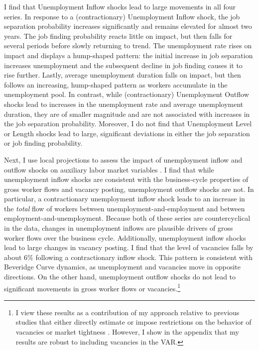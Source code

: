 \documentclass[12pt]{article}
\begin{document}
I find that Unemployment Inflow shocks lead to large movements in all four series. In response to a (contractionary) Unemployment Inflow shock, the job separation probability increases significantly and remains elevated for almost two years. The job finding probability reacts little on impact, but then falls for several periods before slowly returning to trend. The unemployment rate rises on impact and displays a hump-shaped pattern: the initial increase in job separation increases unemployment and the subsequent decline in job finding causes it to rise further. Lastly, average unemployment duration falls on impact, but then follows an increasing, hump-shaped pattern as workers accumulate in the unemployment pool. In contrast, while (contractionary) Unemployment Outflow shocks lead to increases in the unemployment rate and average unemployment duration, they are of smaller magnitude and are not associated with increases in the job separation probability. Moreover, I do not find that Unemployment Level or Length shocks lead to large, significant deviations in either the job separation or job finding probability.
 
Next, I use local projections to assess the impact of unemployment inflow and outflow shocks on auxiliary labor market variables \citep{Jorda:2005aa}. I find that while unemployment inflow shocks are consistent with the business-cycle properties of gross worker flows and vacancy posting, unemployment outflow shocks are not. In particular, a contractionary unemployment inflow shock leads to an increase in the \textit{total} flow of workers between unemployment-and-employment and between employment-and-unemployment. Because both of these series are countercyclical in the data, changes in unemployment inflows are plausible drivers of gross worker flows over the business cycle. Additionally, unemployment inflow shocks lead to large changes in vacancy posting. I find that the level of vacancies falls by about 6\% following a contractionary inflow shock. This pattern is consistent with Beveridge Curve dynamics, as unemployment and vacancies move in opposite directions. On the other hand, unemployment outflow shocks do not lead to significant movements in gross worker flows or vacancies.\footnote{I view these results as a contribution of my approach relative to previous studies that either directly estimate or impose restrictions on the behavior of vacancies or market tightness \citep{Fujita:2011aa, Mercan:2024aa}. However, I show in the appendix that my results are robust to including vacancies in the VAR.}
\end{document}
